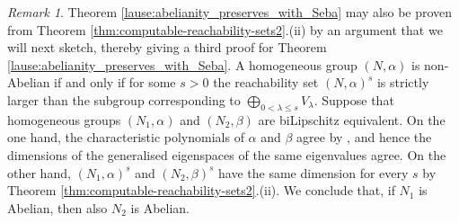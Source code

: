 \documentclass[a4paper,12pt]{amsart}
\theoremstyle{plain}
\theoremstyle{definition}
\theoremstyle{plain}
\theoremstyle{remark}
\newtheorem{huom}[maar]{Remark}
\begin{document}
\begin{huom}
	Theorem \ref{lause:abelianity_preserves_with_Seba} may also be proven 
	from  Theorem \ref{thm:computable-reachability-sets2}.(ii) by an argument that we will next sketch, thereby giving a third proof for Theorem \ref{lause:abelianity_preserves_with_Seba}. A homogeneous group \( (N,\alpha) \) is non-Abelian if and only if for some \( s > 0 \) the reachability set \( (N,\alpha)^s \) is strictly larger than the subgroup corresponding to \( \bigoplus_{0 < \lambda \le s} V_\lambda \).
	Suppose that homogeneous groups \( (N_1,\alpha) \) and \( (N_2,\beta) \) are biLipschitz equivalent.
	On the one hand, the characteristic polynomials of \( \alpha \) and \( \beta \) agree by \cite{avain:CPS}, and hence the dimensions of the generalised eigenspaces of the same eigenvalues agree.
	On the other hand, \( (N_1,\alpha)^s \) and \( (N_2,\beta)^s \) have the same dimension for every \(s\) by Theorem \ref{thm:computable-reachability-sets2}.(ii).
	We conclude that, if \(N_1\) is Abelian, then also \(N_2\) is Abelian.
\end{huom}








\end{document}
